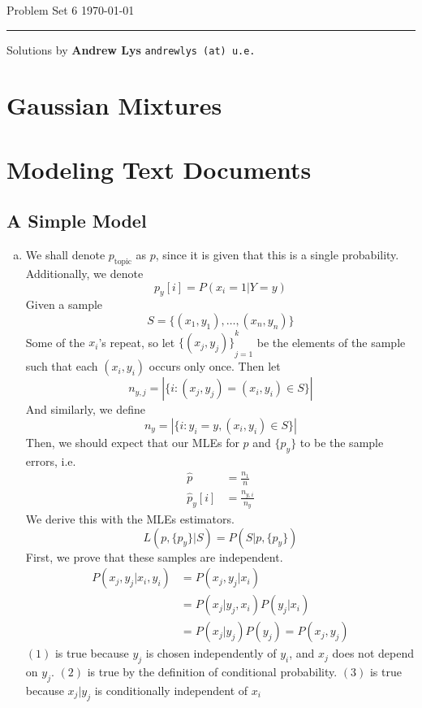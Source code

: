 \documentclass{amsart}
\theoremstyle{definition}
\begin{document}
\noindent
Problem Set 6   \hfill \today  %
\smallskip
\hrule
\smallskip
\noindent
Solutions by {\bf Andrew Lys} \qquad   %
  {\tt andrewlys (at) u.e.}      %

\vspace{0.5cm}

\section{Gaussian Mixtures}
\section{Modeling Text Documents}
\subsection{A Simple Model}

\begin{enumerate}[(a)]
  \item 
    We shall denote $p_{\mathrm{topic}}$ as $p$, since it is given that this is a single probability. 
    Additionally, we denote 
    \[p_y[i] = P(x_i = 1|Y = y)\]
    Given a sample 
    \[
      S = \{(x_1,y_1), \ldots, (x_n, y_n)\}
    \]
    Some of the $x_i$'s repeat, so let ${\{(x_j, y_j)\}}_{j = 1}^k$ be the elements of the sample such that each $(x_i, y_i)$ occurs only once.
    Then let
    \[
      n_{y,j} = |\{i : (x_j, y_j) = (x_i, y_i) \in S\}|
    \]
    And similarly, we define
    \[n_y = |\{i : y_i = y, (x_i, y_i) \in S\}|\]
    Then, we should expect that our MLEs for $p$ and $\{p_y\}$ to be the sample errors, i.e. 
    \begin{align*}
      \hat{p} &= \frac{n_1}{n}\\
      \hat{p}_y[i] &= \frac{n_{y, i}}{n_y}
    \end{align*}
    We derive this with the MLEs estimators. 
    \[L(p, \{p_y\}|S) = P(S| p, \{p_y\})\]
    First, we prove that these samples are independent.
    \begin{align}
      P(x_j, y_j | x_i, y_i) &= P(x_j, y_j|x_i)\\
      &= P(x_j| y_j, x_i)P(y_j|x_i)\\
      &= P(x_j|y_j)P(y_j) = P(x_j, y_j)
    \end{align}
    $(1)$ is true because $y_j$ is chosen independently of $y_i$, and $x_j$ does not depend on $y_j$. 
	$(2)$ is true by the definition of conditional probability. 
	$(3)$ is true because $x_j | y_j$ is conditionally independent of $x_i$

\end{enumerate}
\end{document}
